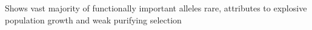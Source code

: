 \documentclass[11pt]{article}
\begin{document}
\citep{tennessen2012evolution} Shows vast majority of functionally important alleles rare, attributes to explosive population growth and weak purifying selection

\citep{hufford2013genomic} \citep{hufford2012comparative}

%
%





\newpage

\end{document}
